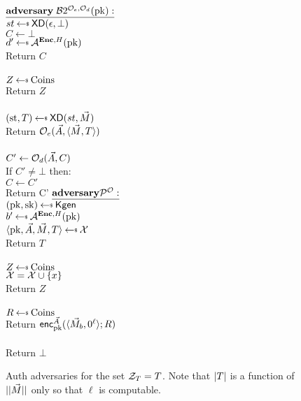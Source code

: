 \begin{figure}[tbhp]
\begin{center}
{
 {$\adversaryv{\;\advB2^{\mathcal{O}_e,\mathcal{O}_d}(\pk)}$}\\
$st \getsr \mdalg(\epsilon,\bot)$\\
$C \gets \bot$\\
$d' \getsr \advA^{\encOracle,H}(\pk)$\\
Return $C$\\ 

\\
  $Z \getsr \mathrm{Coins}$\\
  Return $Z$\\

\queryl{$\encOracle(\vad,\vmsg)$}\\
$(\st, \umd) \getsr \mdalg(st,\vmsg)$\\
Return $\mathcal{O}_e(\vec{A}, \langle \vec{M},T\rangle)$\\

\\
$C' \gets \mathcal{O}_d(\vec{A}, C)$\\
If $C' \neq \bot$ then:\\
\nudge $C \gets C'$\\
Return C'
}
{
 $\adversaryv{\advP^{\mathcal{O}}}$\\
 $(\pk,\sk) \getsr \Kgen$\\
 $b' \getsr \advA^{\encOracle,H}(\pk)$\\
 $\langle \pk,\vad,\vmsg,T \rangle \getsr \cal X$\\
Return $T$\\

\\
  $Z \getsr \mathrm{Coins}$\\
  $\mathcal{X} = \mathcal{X} \cup \{x\}$ \\
  Return $Z$\\

\queryl{$\encOracle(\vad,\vmsg)$}\\
$R \getsr \mathrm{Coins}$\\
Return ${\mathsf{enc}}_{\mathrm{pk}}^{\vec{A}}(\langle \vec{M}_b,0^{\ell}\rangle;R)$\\

\\
Return $\bot$
}
\caption{Auth adversaries for the set $\mathcal{Z}_T = T$.
Note that $|T|$ is a function of $||\vec{M}||$ only so that $\ell$ is computable.}
\end{center}
\end{figure}



